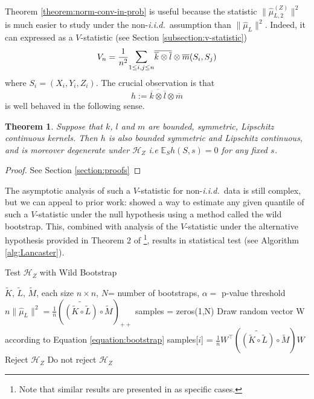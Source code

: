 \documentclass[]{article}
\newtheorem{theorem}{Theorem}
\begin{document}
Theorem \ref{theorem:norm-conv-in-prob} is useful because the statistic $\| \hat \mu^{(Z)}_{L,2} \|^2$ is much easier to study under the non-\emph{i.i.d.}~assumption than $\|\hat \mu_L\|^2$. Indeed, it can expressed as a $V$-statistic (see Section \ref{subsection:v-statistic})
\[ 
V_n = \frac{1}{n^2} \mathlarger{\sum}_{1\leq i,j \leq n} \overline{\overline{k} \otimes \overline{l}}\otimes \overline{m} (S_i,S_j)
\]
where  $S_i = (X_i,Y_i,Z_i)$. The crucial observation is that
\[
 h := \overline{\overline{k} \otimes \overline{l}}\otimes \overline{m}
\]
is well behaved in the following sense.
\begin{theorem}\label{theorem:degenerate-kernel}
Suppose that $k$, $l$ and $m$ are bounded, symmetric, Lipschitz continuous kernels. Then $h$ is also bounded symmetric and Lipschitz continuous, and is moreover degenerate under $\mathcal{H}_Z$ i.e $\mathbb{E}_{S}h(S,s)=0$ for any fixed $s$.
\end{theorem}
\begin{proof}
See Section \ref{section:proofs}
\end{proof}
The asymptotic analysis of such a $V$-statistic for non-\emph{i.i.d.}~data is still complex, but we can appeal to prior work: \citet{leucht2013dependent} showed a way to estimate any given quantile of such a $V$-statistic under the null hypothesis using a method called the wild bootstrap. This, combined with analysis of the $V$-statistic under the alternative hypothesis provided in Theorem 2 of \citet{chwialkowski2014wild}\footnote{Note that similar results are presented in \citet{leucht2013dependent} as specific cases.}, results in statistical test (see Algorithm \ref{alg:Lancaster}).
\begin{algorithm}[tb]
   \caption{Test $\mathcal{H}_Z$ with Wild Bootstrap}
   \label{alg:Lancaster}
\begin{algorithmic}
    $\tilde{K}$, $\tilde{L}$, $\tilde{M}$, each size $n\times n$, $N$= number of bootstraps, $\alpha=$ p-value threshold
   \STATE $n\|\hat{\mu}_L\|^2 = \frac{1}{n}\left(\widetilde{\left( \tilde{K} \circ \tilde{L}\right) }\circ \tilde{M} \right)_{++}$
   \STATE samples = zeros(1,N)
   \STATE Draw random vector W according to Equation \ref{equation:bootstrap}
   \STATE samples[$i$] = $\frac{1}{n}W^\intercal\left( \widetilde{\left( \tilde{K} \circ \tilde{L}\right) }\circ \tilde{M} \right)W$
   \ENDFOR
   \STATE Reject $\mathcal{H}_Z$
   \ELSE
   \STATE Do not reject $\mathcal{H}_Z$
   \ENDIF
\end{algorithmic}
\end{algorithm}
\end{document}
